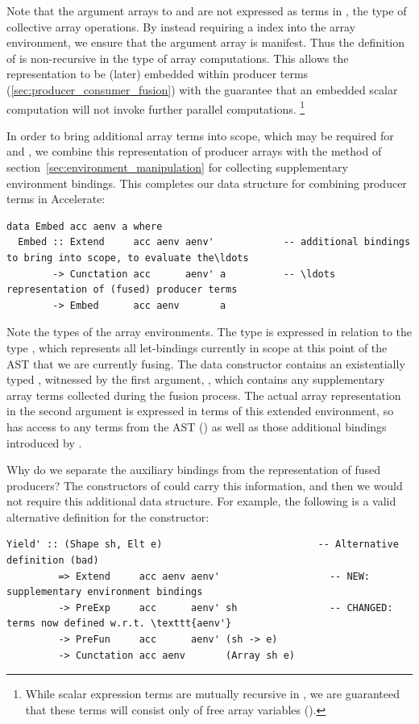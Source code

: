 Note that the argument arrays to  and  are not expressed
as terms in , the type of collective array operations. By instead
requiring a  index  into the array environment, we
ensure that the argument array is manifest. Thus the definition of
 is non-recursive in the type of array computations. This
allows the representation to be (later) embedded within producer terms
(\ref{sec:producer_consumer_fusion}) with the guarantee that an embedded scalar
computation will not invoke further parallel computations.%
\footnote{While scalar expression terms are mutually recursive in
, we are guaranteed that these terms will consist only of free
array variables ().}

In order to bring additional array terms into scope, which may be required for
 and , we combine this representation of producer
arrays with the method of section~\ref{sec:environment_manipulation} for
collecting supplementary environment bindings. This completes our data structure
for combining producer terms in Accelerate:
%
\begin{lstlisting}[style=haskell
    ,label=lst:Embed
    ,caption={Representation of fused producer arrays in Accelerate}]
data Embed acc aenv a where
  Embed :: Extend     acc aenv aenv'            -- additional bindings to bring into scope, to evaluate the\ldots
        -> Cunctation acc      aenv' a          -- \ldots representation of (fused) producer terms
        -> Embed      acc aenv       a
\end{lstlisting}

Note the types of the array environments. The  type is expressed in
relation to the type , which represents all let-bindings
currently in scope at this point of the AST that we
are currently fusing. The data constructor contains an existentially typed
, witnessed by the first argument, , which contains any
supplementary array terms collected during the fusion process. The actual array
representation in the second argument is expressed in terms of this extended
environment, so has access to any terms from the AST () as well as
those additional bindings introduced by .

Why do we separate the auxiliary bindings from the representation of fused
producers? The constructors of  could carry this information,
and then we would not require this additional data structure. For example, the
following is a valid alternative definition for the  constructor:
%
\begin{lstlisting}[style=haskell]
  Yield' :: (Shape sh, Elt e)                           -- Alternative definition (bad)
         => Extend     acc aenv aenv'                   -- NEW: supplementary environment bindings
         -> PreExp     acc      aenv' sh                -- CHANGED: terms now defined w.r.t. \texttt{aenv'}
         -> PreFun     acc      aenv' (sh -> e)
         -> Cunctation acc aenv       (Array sh e)
\end{lstlisting}

